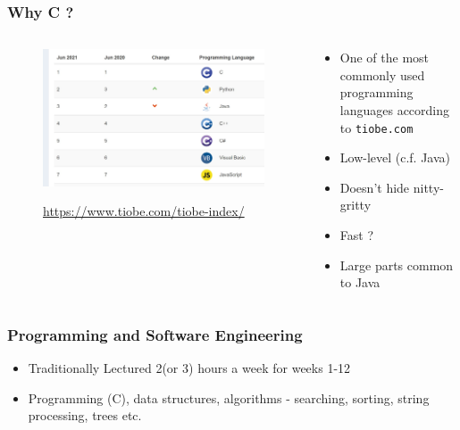 \begin{frame}%
\frametitle{Why C ?}

\begin{columns}

\begin{column}{0.60\textwidth}
\begin{figure}[h]
\centerline{
\includegraphics[width=1.0\textwidth]{../Figs/tiobe.jpg}
}
\centerline{
{\tiny \url{https://www.tiobe.com/tiobe-index/}}
}
\end{figure}
\end{column}

\begin{column}{0.35\textwidth}
\begin{itemize}[<+->]
\item One of the most commonly used programming languages
according to {\tt tiobe.com}
\item Low-level (c.f. Java)
\item Doesn't hide nitty-gritty
\item Fast ?
\item Large parts common to Java
\end{itemize}
\end{column}

\end{columns}
\end{frame}

\begin{frame}%
\frametitle{Programming and Software Engineering}
\begin{itemize}[<+->]
\item Traditionally Lectured 2(or 3) hours a week for weeks 1-12
\item Programming (C), data structures, algorithms - searching, sorting, string processing, trees etc.
\end{itemize}
\end{frame}

